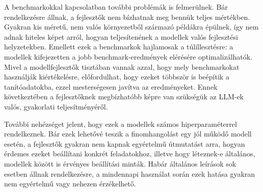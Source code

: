 \documentclass[12pt,a4paper]{extarticle}
\begin{document}
A benchmarkokkal kapcsolatban további problémák is felmerülnek.
Bár rendelkezésre állnak, a fejlesztők nem bízhatnak meg bennük teljes mértékben.
Gyakran kis méretű, nem valós környezetből származó példákra épülnek, így nem adnak hiteles képet arról, hogyan teljesítenének a modellek valós fejlesztési helyzetekben.
Emellett ezek a benchmarkok hajlamosak a túlillesztésre: a modellek kifejezetten a jobb benchmark-eredmények elérésére optimalizálhatók.
Mivel a modellfejlesztők tisztában vannak azzal, hogy mely benchmarkokat használják kiértékelésre, előfordulhat, hogy ezeket többször is beépítik a tanítóadatokba, ezzel mesterségesen javítva az eredményeket.
Ennek következtében a fejlesztőknek megbízhatóbb képre van szükségük az LLM-ek valós, gyakorlati tel\-je\-sít\-mé\-nyé\-ről.

További nehézséget jelent, hogy ezek a modellek számos hiperparaméterrel ren\-del\-kez\-nek.
Bár ezek lehetővé teszik a finomhangolást egy jól működő modell esetén, a fejlesztők gyakran nem kapnak egyértelmű útmutatást arra, hogyan érdemes ezeket beállítani konk\-rét feladatokhoz, illetve hogy léteznek-e általános, modellek között is érvényes beállítási min\-ták.
Habár általános leírások sok esetben állnak rendelkezésre, a mindennapi használat során ezek hatása gyakran nem egyértelmű vagy nehezen érzékelhető.
\end{document}
